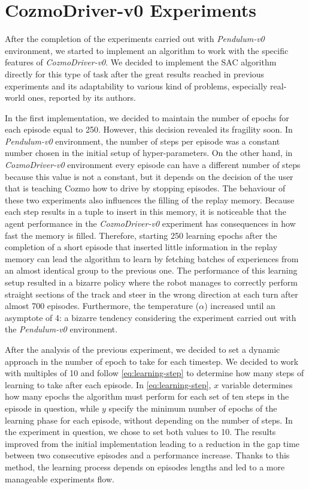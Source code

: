 \FloatBarrier

\section{CozmoDriver-v0 Experiments} \label{sec:cozmo-exp}

After the completion of the experiments carried out with \textit{Pendulum-v0} environment, we started to implement an algorithm to work with the specific features of \textit{CozmoDriver-v0}.
We decided to implement the SAC algorithm directly for this type of task after the great results reached in previous experiments and its adaptability to various kind of problems, especially real-world ones, reported by its authors.

In the first implementation, we decided to maintain the number of epochs for each episode equal to 250.
However, this decision revealed its fragility soon.
In \textit{Pendulum-v0} environment, the number of steps per episode was a constant number chosen in the initial setup of hyper-parameters.
On the other hand, in \textit{CozmoDriver-v0} environment every episode can have a different number of steps because this value is not a constant, but it depends on the decision of the user that is teaching Cozmo how to drive by stopping episodes.
The behaviour of these two experiments also influences the filling of the replay memory.
Because each step results in a tuple to insert in this memory, it is noticeable that the agent performance in the \textit{CozmoDriver-v0} experiment has consequences in how fast the memory is filled.
Therefore, starting 250 learning epochs after the completion of a short episode that inserted little information in the replay memory can lead the algorithm to learn by fetching batches of experiences from an almost identical group to the previous one.
The performance of this learning setup resulted in a bizarre policy where the robot manages to correctly perform straight sections of the track and steer in the wrong direction at each turn after almost 700 episodes.
Furthermore, the temperature ($\alpha$) increased until an asymptote of 4: a bizarre tendency considering the experiment carried out with the \textit{Pendulum-v0} environment.

After the analysis of the previous experiment, we decided to set a dynamic approach in the number of epoch to take for each timestep.
We decided to work with multiples of 10 and follow \vref{eq:learning-step} to determine how many steps of learning to take after each episode.
In \vref{eq:learning-step}, $x$ variable determines how many epochs the algorithm must perform for each set of ten steps in the episode in question, while $y$ specify the minimum number of epochs of the learning phase for each episode, without depending on the number of steps.
In the experiment in question, we chose to set both values to 10.
The results improved from the initial implementation leading to a reduction in the gap time between two consecutive episodes and a performance increase.
Thanks to this method, the learning process depends on episodes lengths and led to a more manageable experiments flow.


